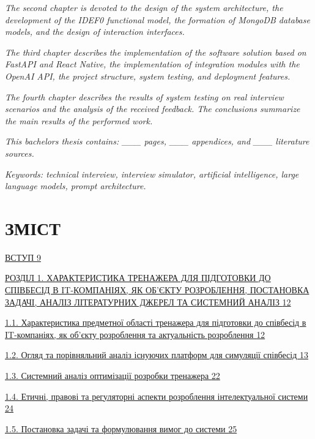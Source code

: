 \documentclass[
]{article}
\begin{document}
\emph{The second chapter is devoted to the design of the system
architecture, the development of the IDEF0 functional model, the
formation of MongoDB database models, and the design of interaction
interfaces.}

\emph{The third chapter describes the implementation of the software
solution based on FastAPI and React Native, the implementation of
integration modules with the OpenAI API, the project structure, system
testing, and deployment features.}

\emph{The fourth chapter describes the results of system testing on real
interview scenarios and the analysis of the received feedback. The
conclusions summarize the main results of the performed work.}

\emph{This bachelor\textquotesingle s thesis contains: \_\_\_ pages,
\_\_\_ appendices, and \_\_\_ literature sources.}

\emph{Keywords: technical interview, interview simulator, artificial
intelligence, large language models, prompt architecture.}

\section{\texorpdfstring{\textbf{ЗМІСТ}}{ЗМІСТ}}\label{ux437ux43cux456ux441ux442}

\hyperref[_Toc228981050]{ВСТУП \hyperref[_Toc228981050]{9}}

\hyperref[_heading=h.5iej67xrqf5j]{РОЗДІЛ 1. ХАРАКТЕРИСТИКА ТРЕНАЖЕРА
ДЛЯ ПІДГОТОВКИ ДО СПІВБЕСІД В IT-КОМПАНІЯХ, ЯК ОБ'ЄКТУ РОЗРОБЛЕННЯ,
ПОСТАНОВКА ЗАДАЧІ, АНАЛІЗ ЛІТЕРАТУРНИХ ДЖЕРЕЛ ТА СИСТЕМНИЙ АНАЛІЗ
\hyperref[_heading=h.5iej67xrqf5j]{12}}

\hyperref[_heading=h.de52ojbplqdx]{1.1. Характеристика предметної
області тренажера для підготовки до співбесід в IT-компаніях, як об'єкту
розроблення та актуальність розроблення
\hyperref[_heading=h.de52ojbplqdx]{12}}

\hyperref[_Toc228981053]{1.2. Огляд та порівняльний аналіз існуючих
платформ для симуляції співбесід \hyperref[_Toc228981053]{13}}

\hyperref[_Toc228981054]{1.3. Системний аналіз оптимізації розробки
тренажера \hyperref[_Toc228981054]{22}}

\hyperref[_Toc228981055]{1.4. Етичні, правові та регуляторні аспекти
розроблення інтелектуальної системи \hyperref[_Toc228981055]{24}}

\hyperref[_Toc228981056]{1.5. Постановка задачі та формулювання вимог до
системи \hyperref[_Toc228981056]{25}}
\end{document}
